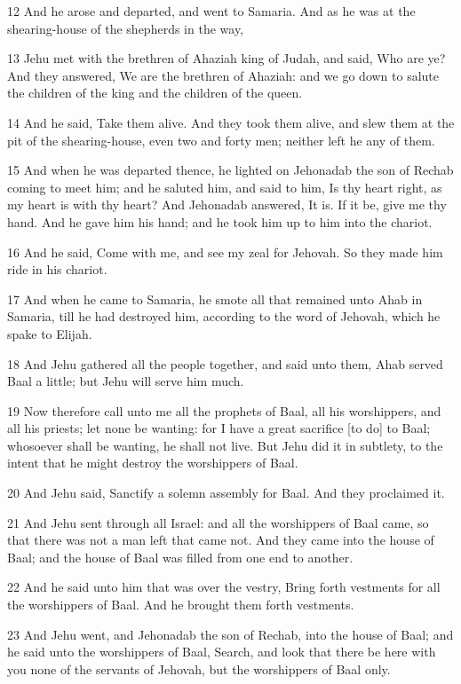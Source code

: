 \par 12 And he arose and departed, and went to Samaria. And as he was at the shearing-house of the shepherds in the way,
\par 13 Jehu met with the brethren of Ahaziah king of Judah, and said, Who are ye? And they answered, We are the brethren of Ahaziah: and we go down to salute the children of the king and the children of the queen.
\par 14 And he said, Take them alive. And they took them alive, and slew them at the pit of the shearing-house, even two and forty men; neither left he any of them.
\par 15 And when he was departed thence, he lighted on Jehonadab the son of Rechab coming to meet him; and he saluted him, and said to him, Is thy heart right, as my heart is with thy heart? And Jehonadab answered, It is. If it be, give me thy hand. And he gave him his hand; and he took him up to him into the chariot.
\par 16 And he said, Come with me, and see my zeal for Jehovah. So they made him ride in his chariot.
\par 17 And when he came to Samaria, he smote all that remained unto Ahab in Samaria, till he had destroyed him, according to the word of Jehovah, which he spake to Elijah.
\par 18 And Jehu gathered all the people together, and said unto them, Ahab served Baal a little; but Jehu will serve him much.
\par 19 Now therefore call unto me all the prophets of Baal, all his worshippers, and all his priests; let none be wanting: for I have a great sacrifice [to do] to Baal; whosoever shall be wanting, he shall not live. But Jehu did it in subtlety, to the intent that he might destroy the worshippers of Baal.
\par 20 And Jehu said, Sanctify a solemn assembly for Baal. And they proclaimed it.
\par 21 And Jehu sent through all Israel: and all the worshippers of Baal came, so that there was not a man left that came not. And they came into the house of Baal; and the house of Baal was filled from one end to another.
\par 22 And he said unto him that was over the vestry, Bring forth vestments for all the worshippers of Baal. And he brought them forth vestments.
\par 23 And Jehu went, and Jehonadab the son of Rechab, into the house of Baal; and he said unto the worshippers of Baal, Search, and look that there be here with you none of the servants of Jehovah, but the worshippers of Baal only.
